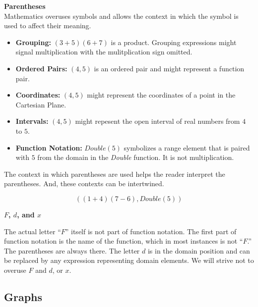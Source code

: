 \documentclass{ximera}
\begin{document}
\begin{notation}  \textbf{\textcolor{blue!55!black}{Parentheses}}  \\

Mathematics overuses symbols and allows the context in which the symbol is used to affect their meaning.
	\begin{itemize}
		\item \textbf{Grouping:} $(3+5)(6+7)$ is a product.  Grouping expressions might signal multiplication with the mulitplication sign omitted.
		\item \textbf{Ordered Pairs:} $(4, 5)$ is an ordered pair and might represent a function pair.
		\item \textbf{Coordinates:} $(4, 5)$ might represent the coordinates of a point in the Cartesian Plane.
		\item \textbf{Intervals:} $(4, 5)$ might repesent the open interval of real numbers from $4$ to $5$.
		\item \textbf{Function Notation:} $Double(5)$ symbolizes a range element that is paired with $5$ from the domain in the \textit{Double} function. It is not multiplication.
	\end{itemize}


The context in which parentheses are used helps the reader interpret the parentheses.  And, these contexts can be intertwined.

\[  ((1+4)(7-6), Double(5))    \]
\end{notation}




\begin{warning} \textbf{$F$, $d$, and $x$}  

The actual letter ``$F$'' itself is not part of function notation.  The first part of function notation is the name of the function, which in most instances is not ``$F$.'' The parentheses are always there.  The letter $d$ is in the domain position and can be replaced by any expression representing domain elements.  We will strive not to overuse $F$ and $d$, or $x$.
\end{warning}









\subsection{Graphs}
\end{document}
